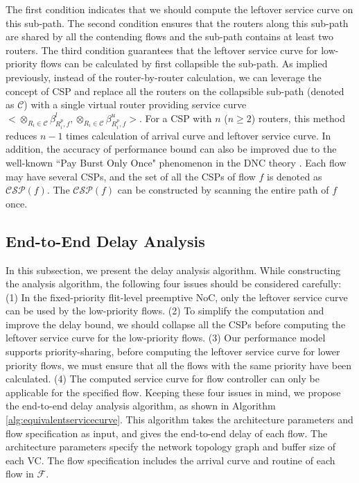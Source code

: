 \documentclass[10pt,journal]{IEEEtran}
\begin{document}
The first condition indicates that we should compute the leftover service curve on this sub-path. The second condition ensures that the routers along this sub-path are shared by all the contending flows and the sub-path contains at least two routers. The third condition guarantees that the leftover service curve for low-priority flows can be calculated by first collapsible the sub-path. As implied previously, instead of the router-by-router calculation, we can leverage the concept of CSP and replace all the routers on the collapsible sub-path (denoted as $\mathcal{C}$) with a single virtual router providing service curve $<\otimes_{R_i\in \mathcal{C}}\beta_{R_i^{p},f}^l,\otimes_{R_i\in \mathcal{C}}\beta_{R_i^{p},f}^u>$. For a CSP with $n$ ($n\geq 2$) routers, this method reduces $n-1$ times calculation of arrival curve and leftover service curve. In addition, the accuracy of performance bound can also be improved due to the well-known ``Pay Burst Only Once" phenomenon in the DNC theory \cite{Boudec2001Network}. Each flow may have several CSPs, and the set of all the CSPs of flow $f$ is denoted as $\mathcal{CSP}(f)$. The $\mathcal{CSP}(f)$ can be constructed by scanning the entire path of $f$ once.

\subsection{End-to-End Delay Analysis}\label{e2elatency}
In this subsection, we present the delay analysis algorithm. While constructing the analysis algorithm, the following four issues should be considered carefully: (1) In the fixed-priority flit-level preemptive NoC, only the leftover service curve can be used by the low-priority flows. (2) To simplify the computation and improve the delay bound, we should collapse all the CSPs before computing the leftover service curve for the low-priority flows. (3) Our performance model supports priority-sharing, before computing the leftover service curve for lower priority flows, we must ensure that all the flows with the same priority have been calculated. (4) The computed service curve for flow controller can only be applicable for the specified flow. Keeping these four issues in mind, we propose the end-to-end delay analysis algorithm, as shown in Algorithm \ref{alg:equivalentservicecurve}. This algorithm takes the architecture parameters and flow specification as input, and gives the end-to-end delay of each flow. The architecture parameters specify the network topology graph and buffer size of each VC. The flow specification includes the arrival curve and routine of each flow in $\mathcal{F}$.
\end{document}

